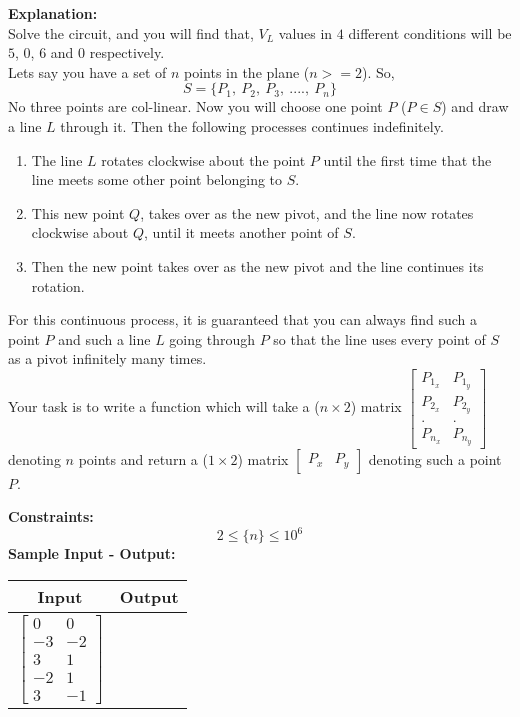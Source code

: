 \documentclass[12pt,paper=a4,answers]{exam}
\begin{document}
\begin{questions}
\textbf{Explanation:} \\
Solve the circuit, and you will find that, $V_L$ values in $4$ different conditions will be $5$, $0$, $6$ and $0$ respectively.
\\
\droppoints
\question[10]
\label{Q:zbus}
Lets say you have a set of $n$ points in the plane ($n >= 2$). So,
$$S = \{P_1,\ P_2,\ P_3,\ ....,\ P_n\}$$ No three points are col-linear. Now you will choose one point $P$ ($P \in S$) and draw a line $L$ through it. Then the following processes continues indefinitely.
\begin{enumerate}
\item The line $L$ rotates clockwise about the point $P$ until the first time that the line meets some other point belonging to $S$.
\item This new point $Q$, takes over as the new pivot, and the line now rotates clockwise about $Q$, until it meets another point of $S$.
\item Then the new point takes over as the new pivot and the line continues its rotation.
\end{enumerate}
For this continuous process, it is guaranteed that you can always find such a point $P$ and such a line $L$ going through $P$ so that the line uses every point of $S$ as a pivot infinitely many times.\\

Your task is to write a function which will take a ($n \times 2$) matrix  $
\begin{bmatrix}
P_{1_x} & P_{1_y}\\
P_{2_x} & P_{2_y}\\
. & .\\
P_{n_x} & P_{n_y}
\end{bmatrix}
$  denoting $n$ points  and return a ($1 \times 2$) matrix  $
\begin{bmatrix}
P_x & P_y
\end{bmatrix}
$  denoting such a point $P$.

\textbf{ Constraints:} 
$$ 2 \leq \{ n \} \leq 10^6$$
\newpage
\textbf{ Sample Input - Output:}\\
\begin{center}
\begin{tabular}{|c|c|}
\hline
\textbf{Input} & \textbf{Output}\\
\hline
$
\begin{bmatrix}
0 & 0\\
-3 & -2\\
3 & 1\\
-2 & 1\\
3 & -1
\end{bmatrix}
$
 & 
 

\end{tabular}
\end{center}
\end{questions}
\end{document}
